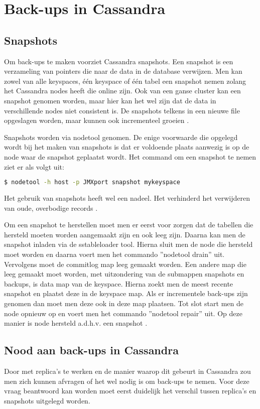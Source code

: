 \chapter{Back-ups in Cassandra}
\label{ch:cassandra_backups}

\section{Snapshots}
Om back-ups te maken voorziet Cassandra snapshots.
Een snapshot is een verzameling van pointers die naar de data in de database verwijzen.
Men kan zowel van alle keyspaces, één keyspace of één tabel een snapshot nemen zolang het Cassandra nodes heeft die online zijn.
Ook van een ganse cluster kan een snapshot genomen worden, maar hier kan het wel zijn dat de data in verschillende nodes niet consistent is.
De snapshots telkens in een nieuwe file opgeslagen worden, maar kunnen ook incrementeel groeien \citep{DataStax2016Snapshot}.

Snapshots worden via nodetool genomen.
De enige voorwaarde die opgelegd wordt bij het maken van snapshots is dat er voldoende plaats aanwezig is op de node waar de snapshot geplaatst wordt.
Het command om een snapshot te nemen ziet er als volgt uit:

\begin{lstlisting}[language=Bash, breaklines=true]
$ nodetool -h host -p JMXport snapshot mykeyspace
\end{lstlisting}

Het gebruik van snapshots heeft wel een nadeel.
Het verhinderd het verwijderen van oude, overbodige records \citep{DataStax2016Snapshot}.

Om een snapshot te herstellen moet men er eerst voor zorgen dat de tabellen die hersteld moeten worden aangemaakt zijn en ook leeg zijn.
Daarna kan men de snapshot inladen via de sstableloader tool.
Hierna sluit men de node die hersteld moet worden en daarna voert men het commando ''nodetool drain'' uit.
Vervolgens moet de commitlog map leeg gemaakt worden.
Een andere map die leeg gemaakt moet worden, met uitzondering van de submappen snapshots en backups, is data map van de keyspace.
Hierna zoekt men de meest recente snapshot en plaatst deze in de keyspace map.
Als er incrementele back-ups zijn genomen dan moet men deze ook in deze map plaatsen.
Tot slot start men de node opnieuw op en voert men het commando ''nodetool repair'' uit.
Op deze manier is node hersteld a.d.h.v. een snapshot \citep{DataStax2016Snapshot}.

\section{Nood aan back-ups in Cassandra}
Door met replica's te werken en de manier waarop dit gebeurt in Cassandra zou men zich kunnen afvragen of het wel nodig is om back-ups te nemen.
Voor deze vraag beantwoord kan worden moet eerst duidelijk het verschil tussen replica's en snapshots uitgelegd worden.

